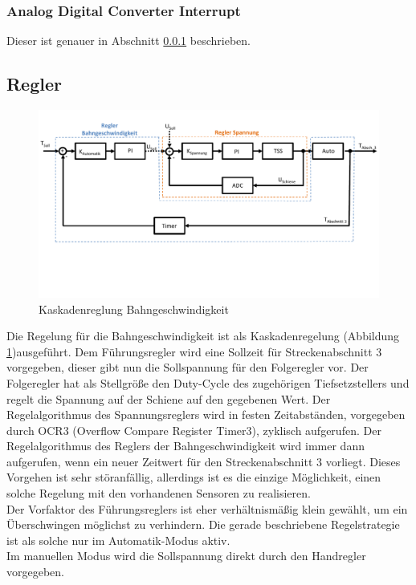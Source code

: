 \documentclass[a4paper, 11pt]{report}
\begin{document}
			\subsubsection{Analog Digital Converter Interrupt}\label{subsubsec:ADCINT}
			Dieser ist genauer in Abschnitt \ref{subsubsec:ADCINT} beschrieben.

	\subsection{Regler}
		\begin{figure}[ht]
			\centering
			\includegraphics[width=\textwidth]{rec/Regler.pdf}
			\caption{Kaskadenreglung Bahngeschwindigkeit}
			\label{img:Regelung}
		\end{figure}
		Die Regelung für die Bahngeschwindigkeit ist als Kaskadenregelung (Abbildung \ref{img:Regelung})ausgeführt.
		Dem Führungsregler wird eine Sollzeit für Streckenabschnitt 3 vorgegeben, dieser gibt nun die Sollspannung für den Folgeregler vor.
		Der Folgeregler hat als Stellgröße den Duty-Cycle des zugehörigen Tiefsetzstellers und regelt die Spannung auf der Schiene auf den gegebenen Wert.
		Der Regelalgorithmus des Spannungsreglers wird in festen Zeitabständen, vorgegeben durch OCR3 (Overflow Compare Register Timer3), zyklisch aufgerufen.
		Der Regelalgorithmus des Reglers der Bahngeschwindigkeit wird immer dann aufgerufen, wenn ein neuer Zeitwert für den Streckenabschnitt 3 vorliegt.
		Dieses Vorgehen ist sehr störanfällig, allerdings ist es die einzige Möglichkeit, einen solche Regelung mit den vorhandenen Sensoren zu realisieren. \\
		Der Vorfaktor des Führungsreglers ist eher verhältnismäßig klein gewählt, um ein Überschwingen möglichst zu verhindern.
		Die gerade beschriebene Regelstrategie ist als solche nur im Automatik-Modus aktiv.\\
		Im manuellen Modus wird die Sollspannung direkt durch den Handregler vorgegeben.
		\newpage
\end{document}
